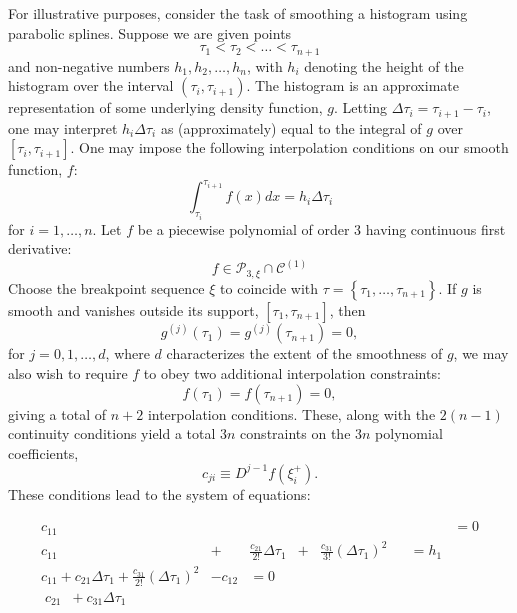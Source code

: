 \documentclass[12pt]{article}
\newcommand{\PP}{\mathcal{P}}
\begin{document}
For illustrative purposes, consider the task of smoothing a histogram using parabolic splines. Suppose we are given points
\[
\tau_1 < \tau_2 < \dots < \tau_{n+1}
\]
and non-negative numbers $h_1, h_2, \dots, h_n$, with $h_i$ denoting the height of the histogram over the interval $\left(\tau_i, \tau_{i+1} \right)$. The histogram is an approximate representation of some underlying density function, $g$. Letting $\Delta \tau_i = \tau_{i+1}-\tau_i$, one may interpret $h_i\Delta \tau_i$ as (approximately) equal to the integral of $g$ over $\left[\tau_i, \tau_{i+1} \right]$. One may impose the following interpolation conditions on our smooth function, $f$:
\begin{equation*} 
\int_{\tau_i}^{\tau_{i+1}} f\left(x\right)dx = h_i\Delta \tau_i
\end{equation*} 
\noindent
for $i=1,\dots, n$. Let $f$ be a piecewise polynomial of order 3 having continuous first derivative:
\[
f \in \PP_{3,\xi} \cap \mathcal{C}^{\left(1\right)}
\]
Choose the breakpoint sequence $\xi$ to coincide with $\tau = \left\{\tau_1,\dots, \tau_{n+1} \right\}$. If $g$ is smooth and vanishes outside its support, $\left[ \tau_1,\tau_{n+1} \right]$, then
\[
g^{\left( j \right)}\left(\tau_1\right) = g^{\left( j \right)}\left(\tau_{n+1}\right) = 0,
\]
\noindent
for $j=0,1,\dots,d$, where $d$ characterizes the extent of the smoothness of $g$, we may also wish to require $f$ to obey two additional interpolation constraints:
\[
f\left( \tau_1 \right) = f\left( \tau_{n+1} \right) = 0,
\]
giving a total of $n+2$ interpolation conditions. These, along with the $2\left(n-1\right)$ continuity conditions yield a total $3n$ constraints on the $3n$ polynomial coefficients,
\[
c_{ji} \equiv D^{j-1} f\left(\xi_i^+ \right).
\]
These conditions lead to the system of equations:

\begin{align*}
c_{11} &  &  &  &  &  &  & =0  \\
c_{11} & + & \frac{c_{21}}{2!} \Delta\tau_{1} & + & \frac{c_{31}}{3!} \left(\Delta\tau_{1}\right)^2  &    &  =h_1\\
c_{11} + c_{21}\Delta\tau_{1} + \frac{c_{31}}{2!} \left(\Delta\tau_{1}\right)^2 &-c_{12}    &  =0\\
\;c_{21}\;\;+c_{31}\Delta\tau_{1}
\end{align*}
\end{document}
